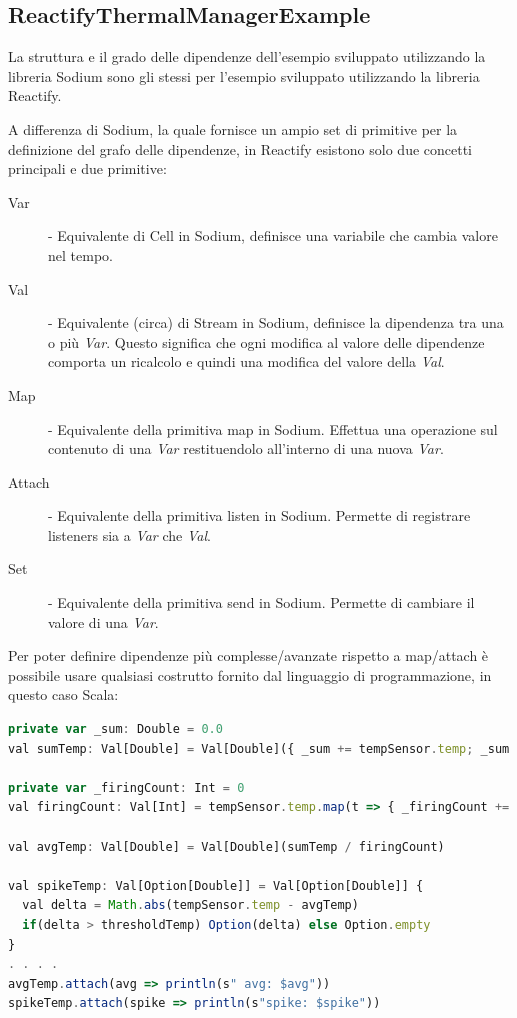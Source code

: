 \documentclass[../main.tex]{subfiles}
\begin{document}
\subsection{ReactifyThermalManagerExample}
La struttura e il grado delle dipendenze dell'esempio sviluppato utilizzando la libreria Sodium sono gli stessi per l'esempio sviluppato utilizzando la libreria Reactify. 

A differenza di Sodium, la quale fornisce un ampio set di primitive per la definizione del grafo delle dipendenze, in Reactify esistono solo due concetti principali e due primitive:
\begin{description}
\item[Var] - Equivalente di Cell in Sodium, definisce una variabile che cambia valore nel tempo.
\item[Val] - Equivalente (circa) di Stream in Sodium, definisce la dipendenza tra una o più \textit{Var}. Questo significa che ogni modifica al valore delle dipendenze comporta un ricalcolo e quindi una modifica del valore della \textit{Val}.
\item[Map] - Equivalente della primitiva map in Sodium. Effettua una operazione sul contenuto di una \textit{Var} restituendolo all'interno di una nuova \textit{Var}.
\item[Attach] - Equivalente della primitiva listen in Sodium. Permette di registrare listeners sia a \textit{Var} che \textit{Val}.
\item[Set] - Equivalente della primitiva send in Sodium. Permette di cambiare il valore di una \textit{Var}.
\end{description}

Per poter definire dipendenze più complesse/avanzate rispetto a map/attach è possibile usare qualsiasi costrutto fornito dal linguaggio di programmazione, in questo caso Scala:
\begin{lstlisting}[language=Javascript, caption=Reactify - Traduzione della parte di grafo delle dipendenze riguardante la temperatura media e gli spike in codice e registrazione listeners]
private var _sum: Double = 0.0
val sumTemp: Val[Double] = Val[Double]({ _sum += tempSensor.temp; _sum })

private var _firingCount: Int = 0
val firingCount: Val[Int] = tempSensor.temp.map(t => { _firingCount += 1; _firingCount })

val avgTemp: Val[Double] = Val[Double](sumTemp / firingCount)

val spikeTemp: Val[Option[Double]] = Val[Option[Double]] {
  val delta = Math.abs(tempSensor.temp - avgTemp)
  if(delta > thresholdTemp) Option(delta) else Option.empty
}
. . . .
avgTemp.attach(avg => println(s" avg: $avg"))
spikeTemp.attach(spike => println(s"spike: $spike"))
\end{lstlisting}
\end{document}
